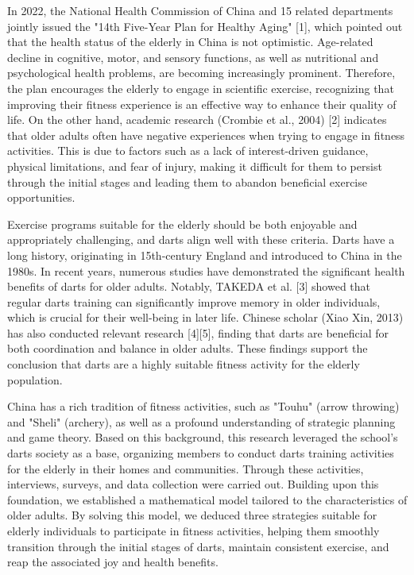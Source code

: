 \documentclass[cjjs]{ipart}
\theoremstyle{plain}
\begin{document}
In 2022, the National Health Commission of China and 15 related departments jointly issued the "14th Five-Year Plan for Healthy Aging" [1], which pointed out that the health status of the elderly in China is not optimistic. Age-related decline in cognitive, motor, and sensory functions, as well as nutritional and psychological health problems, are becoming increasingly prominent. Therefore, the plan encourages the elderly to engage in scientific exercise, recognizing that improving their fitness experience is an effective way to enhance their quality of life. On the other hand, academic research (Crombie et al., 2004) [2] indicates that older adults often have negative experiences when trying to engage in fitness activities. This is due to factors such as a lack of interest-driven guidance, physical limitations, and fear of injury, making it difficult for them to persist through the initial stages and leading them to abandon beneficial exercise opportunities.

Exercise programs suitable for the elderly should be both enjoyable and appropriately challenging, and darts align well with these criteria. Darts have a long history, originating in 15th-century England and introduced to China in the 1980s. In recent years, numerous studies have demonstrated the significant health benefits of darts for older adults. Notably, TAKEDA et al. [3] showed that regular darts training can significantly improve memory in older individuals, which is crucial for their well-being in later life. Chinese scholar (Xiao Xin, 2013) has also conducted relevant research [4][5], finding that darts are beneficial for both coordination and balance in older adults. These findings support the conclusion that darts are a highly suitable fitness activity for the elderly population.

China has a rich tradition of fitness activities, such as "Touhu" (arrow throwing) and "Sheli" (archery), as well as a profound understanding of strategic planning and game theory. Based on this background, this research leveraged the school's darts society as a base, organizing members to conduct darts training activities for the elderly in their homes and communities. Through these activities, interviews, surveys, and data collection were carried out. Building upon this foundation, we established a mathematical model tailored to the characteristics of older adults. By solving this model, we deduced three strategies suitable for elderly individuals to participate in fitness activities, helping them smoothly transition through the initial stages of darts, maintain consistent exercise, and reap the associated joy and health benefits.
\end{document}
